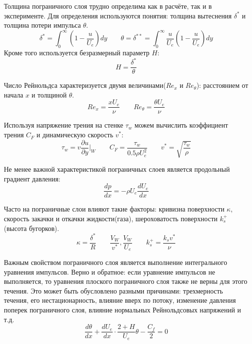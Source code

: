 \documentclass[a4paper]{article}
\begin{document}
		Толщина пограничного слоя трудно определима как в расчёте, так и в эксперименте. Для определения используются понятия: толщина вытеснения $\delta^*$ и толщина потери импульса $\theta$.
		\begin{equation}
			\delta^* = \int_{0}^{\infty}(1 - \frac{u}{U_e})dy \qquad \theta = \delta^{**} = \int_{0}^{\infty} \frac{u}{U_e}(1 - \frac{u}{U_e})dy
		\end{equation}
		Кроме того используется безразмерный параметр $H$:
		\begin{equation}
			H = \frac{\delta^*}{\theta}
		\end{equation}
		 
		Число Рейнольдса характеризуется двумя величинами($Re_x$ и $Re_\theta$): расстоянием от начала $x$ и толщиной $\theta$.
		\begin{equation}
			Re_x = \frac{xU_e}{\nu} \qquad Re_\theta = \frac{\theta U_e}{\nu}
		\end{equation}
		 
		Используя напряжение трения на стенке $\tau_w$ можем вычислить коэффициент трения $C_F$ и динамическую скорость $v^*$:
		\begin{equation}
			\tau_w = v\frac{\partial u}{\partial y}\bigg|_W \qquad C_F = \frac{\tau_w}{0.5\rho U_e^2} \qquad v^* = \sqrt{\frac{\tau_w}{\rho}}
		\end{equation}
	 
		Не менее важной характеристикой пограничных слоев является продольный градиент давления:
		\begin{equation}
			\frac{dp}{dx} = -\rho U_e \frac{dU_e}{dx}
		\end{equation}
		 
		Часто на пограничные слои влияют такие факторы: кривизна поверхности $\kappa$, скорость закачки и откачки жидкости(газа), шероховатость поверхности $k_s^+$(высота бугорков).
		\begin{equation}
		 	\kappa = \frac{\delta^*}{R} \qquad \frac{V_W}{v^*}, \frac{V_W}{U_e} \qquad k_s^+ = \frac{k_s v^*}{\nu}
		\end{equation}
	 	
	 	Важным свойством пограничного слоя является выполнение интегрального уравнения импульсов. Верно и обратное: если уравнение импульсов не выполняется, то уравнения плоского пограничного слоя также не верны для этого течения. Это может быть обусловлено разными причинами: трехмерность течения, его нестационарность, влияние вверх по потоку, изменение давления поперек пограничного слоя, влияние нормальных Рейнольдсовых напряжений и т.д.
	 	\begin{equation}
	 		\frac{d\theta}{dx} + \frac{dU_e}{dx}\cdot\frac{2 + H}{U_e}\theta - \frac{C_f}{2} = 0
	 	\end{equation}
		 
\end{document}
